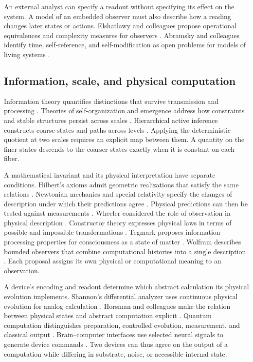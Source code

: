 An external analyst can specify a readout without specifying its effect on the system. A model of an embedded observer must also describe how a reading changes later states or actions. Elshatlawy and colleagues propose operational equivalences and complexity measures for observers \parencite{Elshatlawy2025}. Abramsky and colleagues identify time, self-reference, and self-modification as open problems for models of living systems \parencite{Abramsky2025}.

\subsection{Information, scale, and physical computation}

Information theory quantifies distinctions that survive transmission and processing \parencite{Shannon1948a,Shannon1948b,KullbackLeibler1951,CoverThomas2006}. Theories of self-organization and emergence address how constraints and stable structures persist across scales \parencite{NicolisPrigogine1977,Kauffman1993,Deacon2011,Mitchell2009}. Hierarchical active inference constructs coarse states and paths across levels \parencite{Friston2025ScaleFree}. Applying the deterministic quotient at two scales requires an explicit map between them. A quantity on the finer states descends to the coarser states exactly when it is constant on each fiber.

A mathematical invariant and its physical interpretation have separate conditions. Hilbert's axioms admit geometric realizations that satisfy the same relations \parencite{Hilbert1902}. Newtonian mechanics and special relativity specify the changes of description under which their predictions agree \parencite{Newton1999,Einstein1905}. Physical predictions can then be tested against measurements \parencite{Feynman1965}. Wheeler considered the role of observation in physical description \parencite{Wheeler1983}. Constructor theory expresses physical laws in terms of possible and impossible transformations \parencite{Deutsch2013,DeutschMarletto2015}. Tegmark proposes information-processing properties for consciousness as a state of matter \parencite{Tegmark2015}. Wolfram describes bounded observers that combine computational histories into a single description \parencite{Wolfram2002,Wolfram2023ObserverTheory,RicklesEtAl2023}. Each proposal assigns its own physical or computational meaning to an observation.

A device's encoding and readout determine which abstract calculation its physical evolution implements. Shannon's differential analyzer uses continuous physical evolution for analog calculation \parencite{Shannon1941}. Horsman and colleagues make the relation between physical states and abstract computation explicit \parencite{Horsman2014,Horsman2015}. Quantum computation distinguishes preparation, controlled evolution, measurement, and classical output \parencite{DiVincenzo2000,AharonovCotlerQi2022}. Brain--computer interfaces use selected neural signals to generate device commands \parencite{Wolpaw2002,Willett2023}. Two devices can thus agree on the output of a computation while differing in substrate, noise, or accessible internal state.

